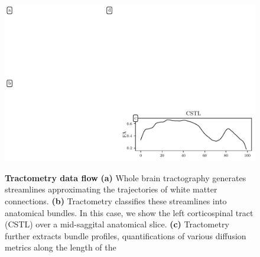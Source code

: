 \documentclass[10pt,letterpaper]{article}
\begin{document}
\begin{figure}[h!]
    \vspace{0.25cm}
    \vspace{-8.25cm}
    \includegraphics[width=\columnwidth]{method-quad.pdf}
    {\label{fig:methods:tractogram}}
    {\label{fig:methods:cst}}
    {\label{fig:methods:tract-profile}}
    {\label{fig:methods:group-structure}}
    \caption{{\bf Tractometry data flow}
        \label{fig:methods}
        {\bf (a)} Whole brain tractography generates streamlines approximating
        the trajectories of white matter connections.
        {\bf (b)} Tractometry classifies these streamlines into anatomical bundles.
        In this case, we show the left corticospinal tract (CSTL) over a mid-saggital
        anatomical slice.
        {\bf (c)} Tractometry further extracts bundle profiles,
        quantifications of various diffusion metrics along the length of the
}
\end{figure}
\end{document}
